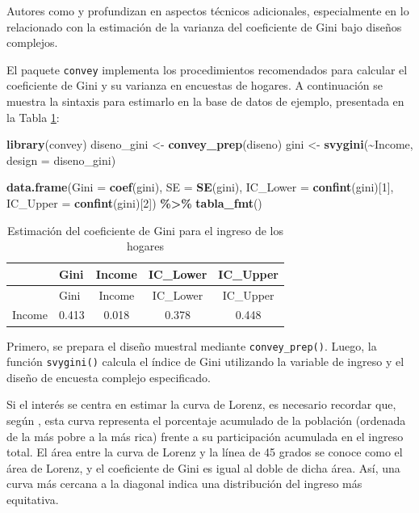 \documentclass[
  spanish,
  12pt,
]{book}
\newenvironment{Shaded}{\begin{snugshade}}{\end{snugshade}}
\newcommand{\AttributeTok}[1]{\textcolor[rgb]{0.13,0.29,0.53}{#1}}
\newcommand{\DecValTok}[1]{\textcolor[rgb]{0.00,0.00,0.81}{#1}}
\newcommand{\FunctionTok}[1]{\textcolor[rgb]{0.13,0.29,0.53}{\textbf{#1}}}
\newcommand{\NormalTok}[1]{#1}
\newcommand{\OtherTok}[1]{\textcolor[rgb]{0.56,0.35,0.01}{#1}}
\newcommand{\SpecialCharTok}[1]{\textcolor[rgb]{0.81,0.36,0.00}{\textbf{#1}}}
\begin{document}
Autores como \citet{osier2009variance} y \citet{langel2013variance} profundizan en aspectos técnicos adicionales, especialmente en lo relacionado con la estimación de la varianza del coeficiente de Gini bajo diseños complejos.

El paquete \texttt{convey} implementa los procedimientos recomendados para calcular el coeficiente de Gini y su varianza en encuestas de hogares. A continuación se muestra la sintaxis para estimarlo en la base de datos de ejemplo, presentada en la Tabla \ref{tab:tab-gini}:

\begin{Shaded}
\begin{Highlighting}[]
\FunctionTok{library}\NormalTok{(convey)}
\NormalTok{diseno\_gini }\OtherTok{\textless{}{-}} \FunctionTok{convey\_prep}\NormalTok{(diseno)}
\NormalTok{gini }\OtherTok{\textless{}{-}} \FunctionTok{svygini}\NormalTok{(}\SpecialCharTok{\textasciitilde{}}\NormalTok{Income, }\AttributeTok{design =}\NormalTok{ diseno\_gini) }

\FunctionTok{data.frame}\NormalTok{(}\AttributeTok{Gini =} \FunctionTok{coef}\NormalTok{(gini),}
           \AttributeTok{SE =} \FunctionTok{SE}\NormalTok{(gini),}
           \AttributeTok{IC\_Lower =} \FunctionTok{confint}\NormalTok{(gini)[}\DecValTok{1}\NormalTok{],}
           \AttributeTok{IC\_Upper =} \FunctionTok{confint}\NormalTok{(gini)[}\DecValTok{2}\NormalTok{]) }\SpecialCharTok{\%\textgreater{}\%}
  \FunctionTok{tabla\_fmt}\NormalTok{()}
\end{Highlighting}
\end{Shaded}

\begin{longtable}[]{@{}llccc@{}}
\caption{\label{tab:tab-gini}Estimación del coeficiente de Gini para el ingreso de los hogares}\tabularnewline
\toprule\noalign{}
& Gini & Income & IC\_Lower & IC\_Upper \\
\midrule\noalign{}
\endfirsthead
\toprule\noalign{}
& Gini & Income & IC\_Lower & IC\_Upper \\
\midrule\noalign{}
\endhead
\bottomrule\noalign{}
\endlastfoot
Income & 0.413 & 0.018 & 0.378 & 0.448 \\
\end{longtable}

Primero, se prepara el diseño muestral mediante \texttt{convey\_prep()}. Luego, la función \texttt{svygini()} calcula el índice de Gini utilizando la variable de ingreso y el diseño de encuesta complejo especificado.

Si el interés se centra en estimar la curva de Lorenz, es necesario recordar que, según \citet{kovacevic1997}, esta curva representa el porcentaje acumulado de la población (ordenada de la más pobre a la más rica) frente a su participación acumulada en el ingreso total. El área entre la curva de Lorenz y la línea de 45 grados se conoce como el área de Lorenz, y el coeficiente de Gini es igual al doble de dicha área. Así, una curva más cercana a la diagonal indica una distribución del ingreso más equitativa.
\end{document}
